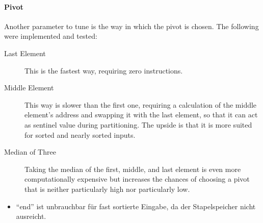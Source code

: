 \paragraph{Pivot}
Another parameter to tune is the way in which the pivot is chosen.
The following were implemented and tested:
\begin{description}
	\item[Last Element]
	This is the fastest way, requiring zero instructions.

	\item[Middle Element]
	This way is slower than the first one, requiring a calculation of the middle element's address and swapping it with the last element, so that it can act as sentinel value during partitioning.
	The upside is that it is more suited for sorted and nearly sorted inputs.

	\item[Median of Three]
	Taking the median of the first, middle, and last element is even more computationally expensive but increases the chances of choosing a pivot that is neither particularly high nor particularly low.
\end{description}

\begin{itemize}
	\item
	\enquote{end} ist unbrauchbar für fast sortierte Eingabe, da der Stapelspeicher nicht ausreicht.
\end{itemize}
